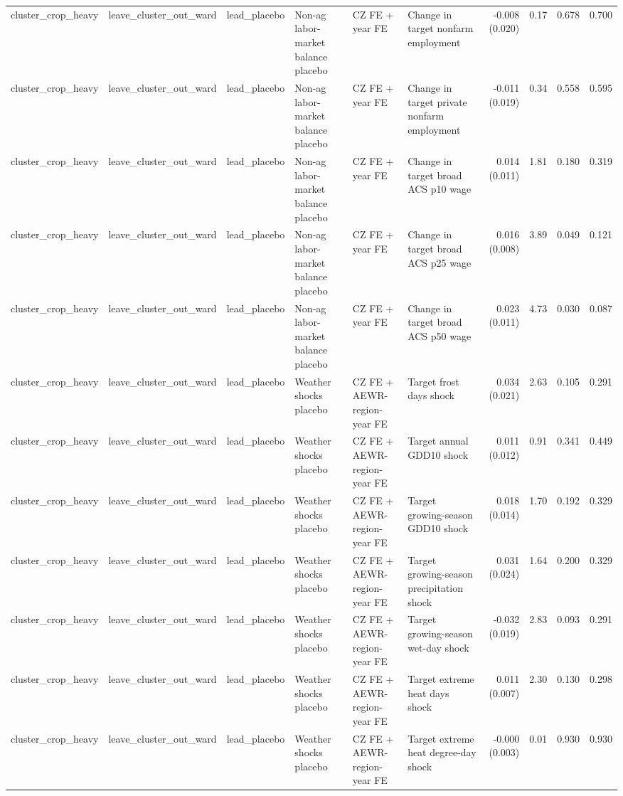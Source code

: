 \begin{tabular}{llllllrrrr}
cluster_crop_heavy & leave_cluster_out_ward & lead_placebo & Non-ag labor-market balance placebo & CZ FE + year FE & Change in target nonfarm employment & -0.008 (0.020) & 0.17 & 0.678 & 0.700 \\
cluster_crop_heavy & leave_cluster_out_ward & lead_placebo & Non-ag labor-market balance placebo & CZ FE + year FE & Change in target private nonfarm employment & -0.011 (0.019) & 0.34 & 0.558 & 0.595 \\
cluster_crop_heavy & leave_cluster_out_ward & lead_placebo & Non-ag labor-market balance placebo & CZ FE + year FE & Change in target broad ACS p10 wage & 0.014 (0.011) & 1.81 & 0.180 & 0.319 \\
cluster_crop_heavy & leave_cluster_out_ward & lead_placebo & Non-ag labor-market balance placebo & CZ FE + year FE & Change in target broad ACS p25 wage & 0.016 (0.008) & 3.89 & 0.049 & 0.121 \\
cluster_crop_heavy & leave_cluster_out_ward & lead_placebo & Non-ag labor-market balance placebo & CZ FE + year FE & Change in target broad ACS p50 wage & 0.023 (0.011) & 4.73 & 0.030 & 0.087 \\
cluster_crop_heavy & leave_cluster_out_ward & lead_placebo & Weather shocks placebo & CZ FE + AEWR-region-year FE & Target frost days shock & 0.034 (0.021) & 2.63 & 0.105 & 0.291 \\
cluster_crop_heavy & leave_cluster_out_ward & lead_placebo & Weather shocks placebo & CZ FE + AEWR-region-year FE & Target annual GDD10 shock & 0.011 (0.012) & 0.91 & 0.341 & 0.449 \\
cluster_crop_heavy & leave_cluster_out_ward & lead_placebo & Weather shocks placebo & CZ FE + AEWR-region-year FE & Target growing-season GDD10 shock & 0.018 (0.014) & 1.70 & 0.192 & 0.329 \\
cluster_crop_heavy & leave_cluster_out_ward & lead_placebo & Weather shocks placebo & CZ FE + AEWR-region-year FE & Target growing-season precipitation shock & 0.031 (0.024) & 1.64 & 0.200 & 0.329 \\
cluster_crop_heavy & leave_cluster_out_ward & lead_placebo & Weather shocks placebo & CZ FE + AEWR-region-year FE & Target growing-season wet-day shock & -0.032 (0.019) & 2.83 & 0.093 & 0.291 \\
cluster_crop_heavy & leave_cluster_out_ward & lead_placebo & Weather shocks placebo & CZ FE + AEWR-region-year FE & Target extreme heat days shock & 0.011 (0.007) & 2.30 & 0.130 & 0.298 \\
cluster_crop_heavy & leave_cluster_out_ward & lead_placebo & Weather shocks placebo & CZ FE + AEWR-region-year FE & Target extreme heat degree-day shock & -0.000 (0.003) & 0.01 & 0.930 & 0.930 \\

\end{tabular}
